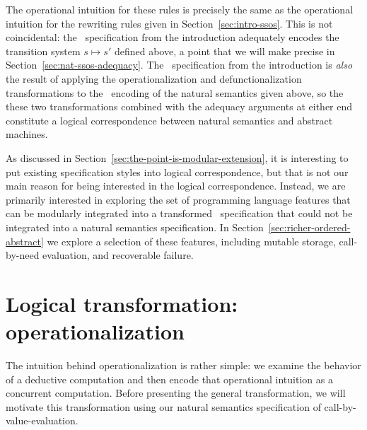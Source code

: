 The operational intuition for these rules is precisely the same as the
operational intuition for the rewriting rules given in
Section~\ref{sec:intro-ssos}. This is not coincidental: the
\sls~specification from the introduction adequately encodes the
transition system $s \mapsto s'$ defined above, a point that we will
make precise in Section~\ref{sec:nat-ssos-adequacy}. The
\sls~specification from the introduction is {\it also} the result of
applying the operationalization and defunctionalization
transformations to the \sls~encoding of the natural semantics given
above, so the these two transformations combined with the adequacy
arguments at either end constitute a logical correspondence between
natural semantics and abstract machines. 

As discussed in Section~\ref{sec:the-point-is-modular-extension}, it
is interesting to put existing specification styles into logical
correspondence, but that is not our main reason for being interested
in the logical correspondence. Instead, we are primarily interested in
exploring the set of programming language features that can be
modularly integrated into a transformed \sls~specification that could
not be integrated into a natural semantics specification.  In
Section~\ref{sec:richer-ordered-abstract} we explore a selection of
these features, including mutable storage, call-by-need evaluation,
and recoverable failure.

\section{Logical transformation: operationalization}
\label{sec:operationalization}

The intuition behind operationalization is rather simple: we examine
the behavior of a deductive computation and then encode that
operational intuition as a concurrent computation.  Before presenting
the general transformation, we will motivate this transformation using
our natural semantics specification of call-by-value-evaluation. 

